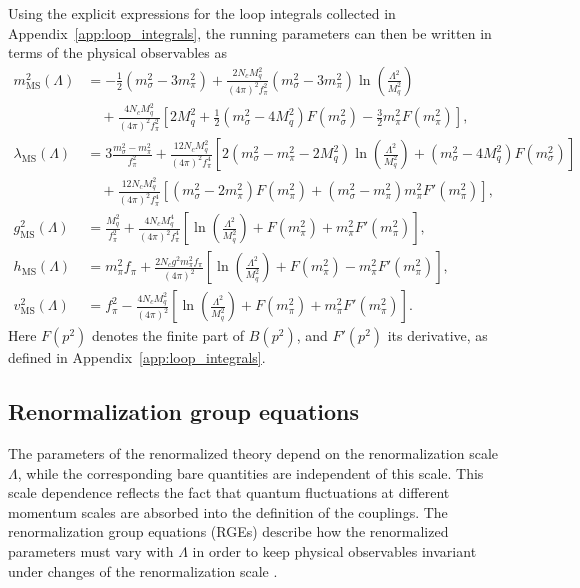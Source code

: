 Using the explicit expressions for the loop integrals collected in
Appendix~\ref{app:loop_integrals}, the running parameters can then be
written in terms of the physical observables as
\begin{align}
m^2_{\mathrm{MS}}(\Lambda)
&=
-\frac{1}{2}(m_\sigma^2-3m_\pi^2)
+
\frac{2N_cM_q^2}{(4\pi)^2f_\pi^2}
(m_\sigma^2-3m_\pi^2)
\ln\!\left(\frac{\Lambda^2}{M_q^2}\right)
\nonumber\\
&\quad
+
\frac{4N_cM_q^2}{(4\pi)^2f_\pi^2}
\left[
2M_q^2
+
\frac{1}{2}(m_\sigma^2-4M_q^2)F(m_\sigma^2)
-
\frac{3}{2}m_\pi^2F(m_\pi^2)
\right], \\
\lambda_{\mathrm{MS}}(\Lambda)
&=
3\frac{m_\sigma^2-m_\pi^2}{f_\pi^2}
+
\frac{12N_cM_q^2}{(4\pi)^2f_\pi^4}
\left[
2(m_\sigma^2-m_\pi^2-2M_q^2)
\ln\!\left(\frac{\Lambda^2}{M_q^2}\right)
+
(m_\sigma^2-4M_q^2)F(m_\sigma^2)
\right]
\nonumber\\
&\quad
+
\frac{12N_cM_q^2}{(4\pi)^2f_\pi^4}
\left[
(m_\sigma^2-2m_\pi^2)F(m_\pi^2)
+
(m_\sigma^2-m_\pi^2)m_\pi^2F'(m_\pi^2)
\right], \\
g^2_{\mathrm{MS}}(\Lambda)
&=
\frac{M_q^2}{f_\pi^2}
+
\frac{4N_cM_q^4}{(4\pi)^2f_\pi^4}
\left[
\ln\!\left(\frac{\Lambda^2}{M_q^2}\right)
+
F(m_\pi^2)
+
m_\pi^2F'(m_\pi^2)
\right], \\
h_{\mathrm{MS}}(\Lambda)
&=
m_\pi^2f_\pi
+
\frac{2N_cg^2m_\pi^2f_\pi}{(4\pi)^2}
\left[
\ln\!\left(\frac{\Lambda^2}{M_q^2}\right)
+
F(m_\pi^2)
-
m_\pi^2F'(m_\pi^2)
\right], \\
v^2_{\mathrm{MS}}(\Lambda)
&=
f_\pi^2
-
\frac{4N_cM_q^2}{(4\pi)^2}
\left[
\ln\!\left(\frac{\Lambda^2}{M_q^2}\right)
+
F(m_\pi^2)
+
m_\pi^2F'(m_\pi^2)
\right].
\end{align}
Here $F(p^2)$ denotes the finite part of $B(p^2)$, and $F'(p^2)$ its
derivative, as defined in Appendix~\ref{app:loop_integrals}.

\subsection*{Renormalization group equations}

The parameters of the renormalized theory depend on the
renormalization scale \(\Lambda\), while the corresponding bare
quantities are independent of this scale. This scale dependence
reflects the fact that quantum fluctuations at different momentum
scales are absorbed into the definition of the couplings. The
renormalization group equations (RGEs) describe how the renormalized
parameters must vary with \(\Lambda\) in order to keep physical
observables invariant under changes of the renormalization scale
\cite{PeskinSchroeder1995,WeinbergQFT}.

